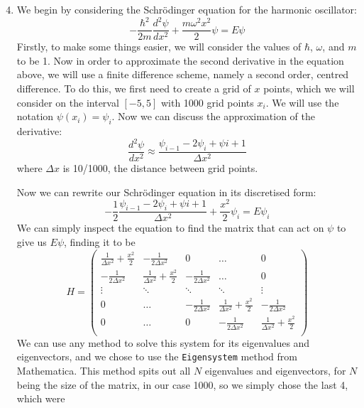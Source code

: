 \documentclass[11pt]{article}
\begin{document}
\begin{enumerate}
    \setcounter{enumi}{3}
    \item We begin by considering the Schr\"odinger equation for the harmonic oscillator:
    \begin{equation}
        -\frac{\hbar^2}{2m}\frac{d^2\psi}{dx^2}+\frac{m\omega^2x^2}{2}\psi=E\psi
    \end{equation}
    Firstly, to make some things easier, we will consider the values of $\hbar$, $\omega$, and $m$ to be 1. Now in order to approximate the second derivative in the equation above, we will use a finite difference scheme, namely a second order, centred difference. To do this, we first need to create a grid of $x$ points, which we will consider on the interval $[-5,5]$ with 1000 grid points $x_i$. We will use the notation $\psi(x_i)=\psi_i$. Now we can discuss the approximation of the derivative:
    \begin{equation}
        \frac{d^2\psi}{dx^2}\approx\frac{\psi_{i-1}-2\psi_i+\psi{i+1}}{\Delta x^2}
    \end{equation}
    where $\Delta x$ is 10/1000, the distance between grid points.

    Now we can rewrite our Schr\"odinger equation in its discretised form:
    \begin{equation}
        -\frac{1}{2}\frac{\psi_{i-1}-2\psi_i+\psi{i+1}}{\Delta x^2}+\frac{x^2}{2}\psi_i=E\psi_i
    \end{equation}
    We can simply inspect the equation to find the matrix that can act on $\psi$ to give us $E\psi$, finding it to be 
    \begin{equation}
        H=
        \begin{pmatrix}
            \frac{1}{\Delta x^2}+\frac{x^2}{2} & -\frac{1}{2\Delta x^2} & 0 & \dots & 0 \\
            -\frac{1}{2\Delta x^2} & \frac{1}{\Delta x^2}+\frac{x^2}{2} & -\frac{1}{2\Delta x^2} & \dots & 0 \\
            \vdots & \ddots & \ddots & \ddots & \vdots \\
            0 & \dots & -\frac{1}{2\Delta x^2} & \frac{1}{\Delta x^2}+\frac{x^2}{2} & -\frac{1}{2\Delta x^2} \\
            0 & \dots & 0 & -\frac{1}{2\Delta x^2} & \frac{1}{\Delta x^2}+\frac{x^2}{2} \\
        \end{pmatrix}
    \end{equation}
    We can use any method to solve this system for its eigenvalues and eigenvectors, and we chose to use the \texttt{Eigensystem} method from Mathematica. This method spits out all $N$ eigenvalues and eigenvectors, for $N$ being the size of the matrix, in our case 1000, so we simply chose the last 4, which were
    

\end{enumerate}
\end{document}
